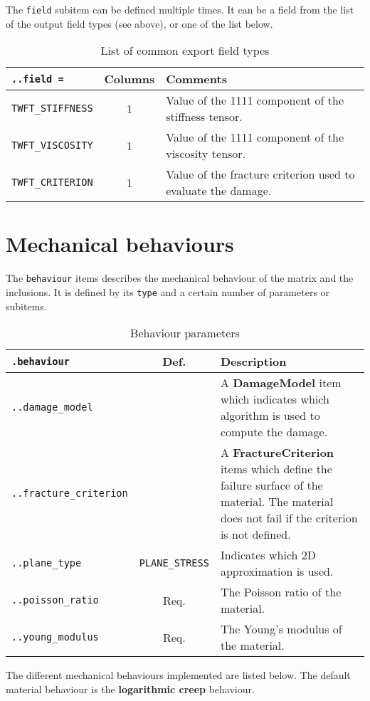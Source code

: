 \documentclass[10pt]{article}
\begin{document}
The \verb+field+ subitem can be defined multiple times.
It can be a field from the list of the output field types (see above), or one of the list below.

\begin{table}[h!]
\begin{tabularx}{\textwidth}{lcX}
\verb+..field =+ & Columns & Comments\\
\hline
\verb+TWFT_STIFFNESS+ & 1 &  Value of the 1111 component of the stiffness tensor.\\	
\verb+TWFT_VISCOSITY+ & 1 &  Value of the 1111 component of the viscosity tensor.\\	
\verb+TWFT_CRITERION+ & 1 &  Value of the fracture criterion used to evaluate the damage.\\	
\hline
\end{tabularx}
\caption{List of common export field types}
\end{table}

\section{Mechanical behaviours}

The \verb+behaviour+ items describes the mechanical behaviour of the matrix and the inclusions.
It is defined by its \verb+type+ and a certain number of parameters or subitems.

\begin{table}[h!]
\begin{tabularx}{\textwidth}{lcX}
\verb+.behaviour+ & Def. & Description\\
\hline
\verb+..damage_model+ &   & A \textbf{DamageModel} item which indicates which algorithm is used to compute the damage.\\	
\verb+..fracture_criterion+ &   & A \textbf{FractureCriterion} items which define the failure surface of the material. The material does not fail if the criterion is not defined.\\	
\verb+..plane_type+ & \verb+PLANE_STRESS+ & Indicates which 2D approximation is used.\\
\verb+..poisson_ratio+ & Req. & The Poisson ratio of the material.\\
\verb+..young_modulus+ & Req. & The Young's modulus of the material.\\
\hline
\end{tabularx}
\caption{Behaviour parameters}
\end{table}

The different mechanical behaviours implemented are listed below. The default material behaviour is the \textbf{logarithmic creep} behaviour.
\end{document}

